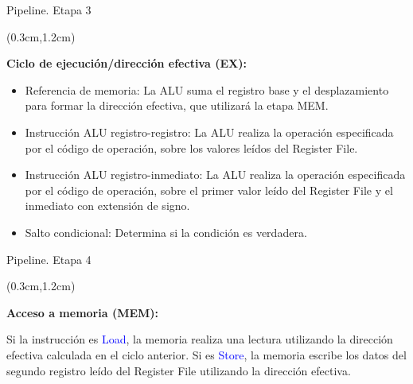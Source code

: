 \documentclass[table,dvipsnames,aspectratio=169]{beamer}
\begin{document}
\begin{frame}{Pipeline. Etapa 3}
 \begin{textblock*}{\textwidth}(0.3cm,1.2cm)
  \begin{tcolorbox}[enhanced jigsaw,rounded corners, drop fuzzy shadow=ShadowColor]

   \textbf{\color{Blue}Ciclo de ejecución/dirección efectiva (EX):}

   \begin{itemize}[<+(2)->]\justifying
    \item Referencia de memoria: La ALU suma el registro base y el desplazamiento para formar la dirección efectiva, que utilizará la etapa MEM.
    \item Instrucción ALU registro-registro: La ALU realiza la operación especificada por el código de operación, sobre los valores leídos del Register File.
    \item Instrucción ALU registro-inmediato: La ALU realiza la operación especificada por el código de operación, sobre el primer valor leído del Register File y el inmediato con extensión de signo.
    \item Salto condicional: Determina si la condición es verdadera.
   \end{itemize}
  \end{tcolorbox}
 \end{textblock*}
\end{frame}

\begin{frame}{Pipeline. Etapa 4}
 \begin{textblock*}{\textwidth}(0.3cm,1.2cm)
  \begin{tcolorbox}[enhanced jigsaw,rounded corners, drop fuzzy shadow=ShadowColor]
   \textbf{\color{Blue}Acceso a memoria (MEM):}

   Si la instrucción es \textcolor{Blue}{Load}, la memoria realiza una lectura utilizando la dirección efectiva calculada en el ciclo anterior. Si es \textcolor{Blue}{Store}, la memoria escribe los datos del segundo registro leído del Register File utilizando la dirección efectiva.
  \end{tcolorbox}
 \end{textblock*}
\end{frame}
\end{document}
